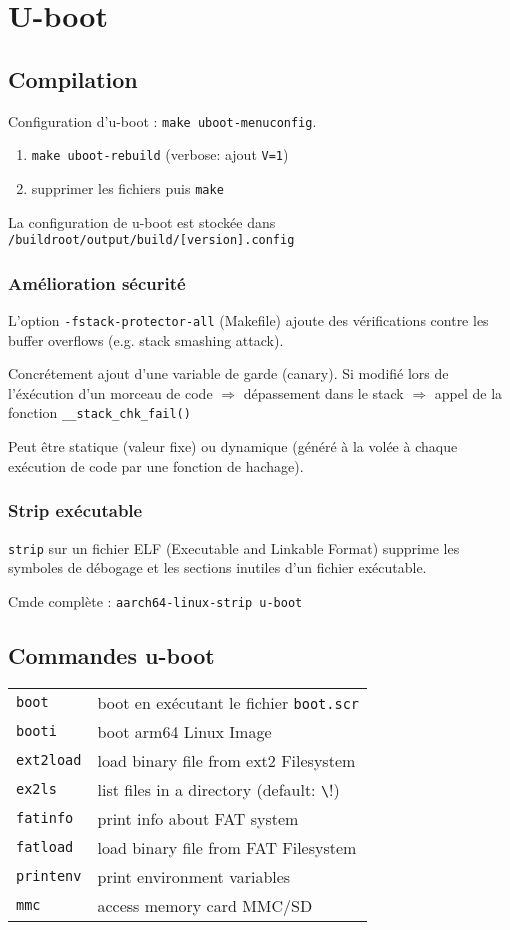 \section{U-boot}
\subsection{Compilation}
Configuration d'u-boot : \verb!make uboot-menuconfig!.
\begin{enumerate}
    \item \verb!make uboot-rebuild! (verbose: ajout \verb+V=1+)
    \item supprimer les fichiers puis \verb!make!
\end{enumerate}
La configuration de u-boot est stockée dans \verb!/buildroot/output/build/[version].config!
\subsubsection{Amélioration sécurité}
L'option \verb!-fstack-protector-all! (Makefile) ajoute des vérifications contre les buffer overflows (e.g. stack smashing attack).

Concrétement ajout d'une variable de garde (canary). Si modifié lors de l'éxécution d'un morceau de code $\Rightarrow$ dépassement dans le stack $\Rightarrow$ appel de la fonction \verb!__stack_chk_fail()!

Peut être statique (valeur fixe) ou dynamique (généré à la volée à chaque exécution de code par une fonction de hachage).

\subsubsection{Strip exécutable}
\verb+strip+ sur un fichier ELF (Executable and Linkable Format) supprime les symboles de débogage et les sections inutiles d'un fichier exécutable.

Cmde complète : \verb+aarch64-linux-strip u-boot+
\subsection{Commandes u-boot}
\begin{table}[H]
\begin{tabular}{|l|l|}
    \hline
    \verb!boot!     & boot en exécutant le fichier \verb+boot.scr+\\
    \verb!booti!    & boot arm64 Linux Image\\
    \verb!ext2load! & load binary file from ext2 Filesystem\\
    \verb!ex2ls!    & list files in a directory (default: \verb!\!)\\
    \verb!fatinfo!  & print info about FAT system\\
    \verb!fatload!  & load binary file from FAT Filesystem\\
    \verb!printenv! & print environment variables\\
    \verb!mmc!      & access memory card MMC/SD\\
    \hline
\end{tabular}
\end{table}

